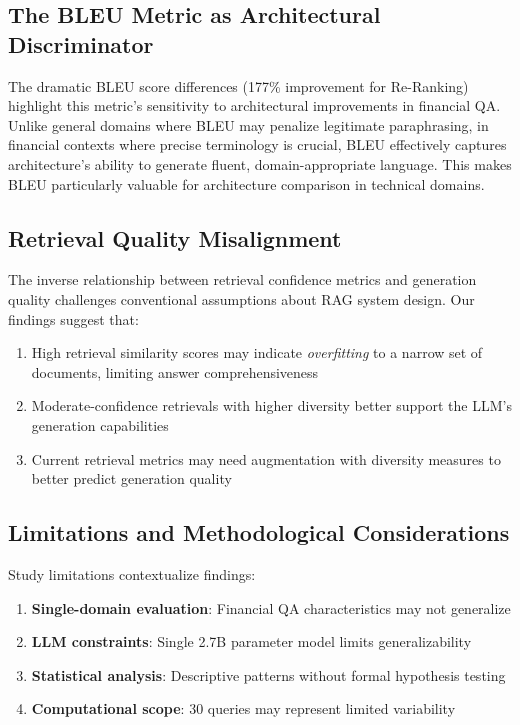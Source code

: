 \documentclass[11pt]{article}
\begin{document}
\subsection{The BLEU Metric as Architectural Discriminator}

The dramatic BLEU score differences (177\% improvement for Re-Ranking) highlight 
this metric's sensitivity to architectural improvements in financial QA. Unlike 
general domains where BLEU may penalize legitimate paraphrasing, in financial 
contexts where precise terminology is crucial, BLEU effectively captures 
architecture's ability to generate fluent, domain-appropriate language. This 
makes BLEU particularly valuable for architecture comparison in technical domains.

\subsection{Retrieval Quality Misalignment}

The inverse relationship between retrieval confidence metrics and generation 
quality challenges conventional assumptions about RAG system design. Our 
findings suggest that:
\begin{enumerate}
    \item High retrieval similarity scores may indicate \textit{overfitting} 
    to a narrow set of documents, limiting answer comprehensiveness
    \item Moderate-confidence retrievals with higher diversity better 
    support the LLM's generation capabilities
    \item Current retrieval metrics may need augmentation with diversity 
    measures to better predict generation quality
\end{enumerate}

\subsection{Limitations and Methodological Considerations}

Study limitations contextualize findings:
\begin{enumerate}
    \item \textbf{Single-domain evaluation}: Financial QA characteristics may not generalize
    \item \textbf{LLM constraints}: Single 2.7B parameter model limits generalizability
    \item \textbf{Statistical analysis}: Descriptive patterns without formal hypothesis testing
    \item \textbf{Computational scope}: 30 queries may represent limited variability
\end{enumerate}
\end{document}
